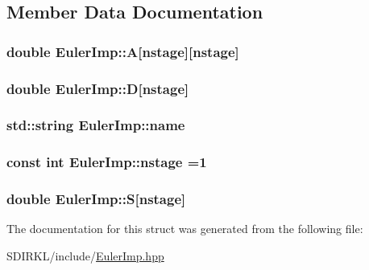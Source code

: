 \subsection{Member Data Documentation}
\hypertarget{structEulerImp_a9696fe25e092ba525ca929e16f5244e6}{
\subsubsection[{A}]{\setlength{\rightskip}{0pt plus 5cm}double Euler\-Imp\-::\-A\mbox{[}{\bf nstage}\mbox{]}\mbox{[}{\bf nstage}\mbox{]}}}\label{structEulerImp_a9696fe25e092ba525ca929e16f5244e6}
\hypertarget{structEulerImp_aae89cc5b49a2315dd0ed0f5deb20a621}{
\subsubsection[{D}]{\setlength{\rightskip}{0pt plus 5cm}double Euler\-Imp\-::\-D\mbox{[}{\bf nstage}\mbox{]}}}\label{structEulerImp_aae89cc5b49a2315dd0ed0f5deb20a621}
\hypertarget{structEulerImp_ac40dc2dcd3e175c730f562d2e4a1c88d}{
\subsubsection[{name}]{\setlength{\rightskip}{0pt plus 5cm}std\-::string Euler\-Imp\-::name}}\label{structEulerImp_ac40dc2dcd3e175c730f562d2e4a1c88d}
\hypertarget{structEulerImp_a10a0277bebf35dd22df6827f4e1311bb}{
\subsubsection[{nstage}]{\setlength{\rightskip}{0pt plus 5cm}const int Euler\-Imp\-::nstage =1\hspace{0.3cm}{\ttfamily [static]}}}\label{structEulerImp_a10a0277bebf35dd22df6827f4e1311bb}
\hypertarget{structEulerImp_acad84c415cd443ec0190344ca5947a0c}{
\subsubsection[{S}]{\setlength{\rightskip}{0pt plus 5cm}double Euler\-Imp\-::\-S\mbox{[}{\bf nstage}\mbox{]}}}\label{structEulerImp_acad84c415cd443ec0190344ca5947a0c}


The documentation for this struct was generated from the following file\-:\begin{DoxyCompactItemize}
\item 
S\-D\-I\-R\-K\-L/include/\hyperlink{EulerImp_8hpp}{Euler\-Imp.\-hpp}\end{DoxyCompactItemize}
